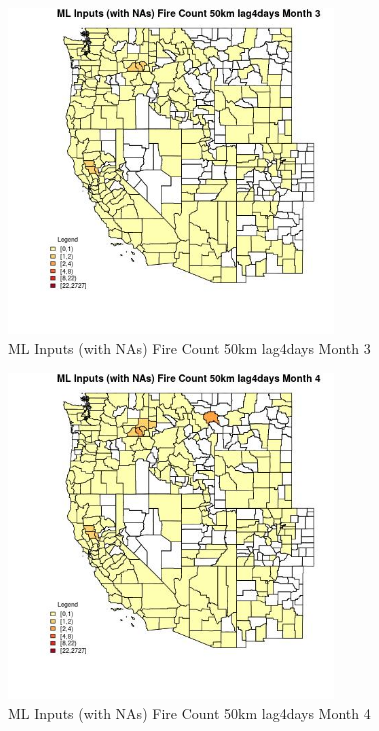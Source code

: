 \begin{figure} 
\centering  
\includegraphics[width=0.77\textwidth]{Code_Outputs/Report_ML_input_PM25_Step4_part_f_de_duplicated_aveswNAs_CountyFire_Count_50km_lag4daysmedianMonth3.jpg} 
\caption{\label{fig:Report_ML_input_PM25_Step4_part_f_de_duplicated_aveswNAsCountyFire_Count_50km_lag4daysmedianMonth3}ML Inputs (with NAs) Fire Count 50km lag4days Month 3} 
\end{figure} 
 

\begin{figure} 
\centering  
\includegraphics[width=0.77\textwidth]{Code_Outputs/Report_ML_input_PM25_Step4_part_f_de_duplicated_aveswNAs_CountyFire_Count_50km_lag4daysmedianMonth4.jpg} 
\caption{\label{fig:Report_ML_input_PM25_Step4_part_f_de_duplicated_aveswNAsCountyFire_Count_50km_lag4daysmedianMonth4}ML Inputs (with NAs) Fire Count 50km lag4days Month 4} 
\end{figure} 
 

